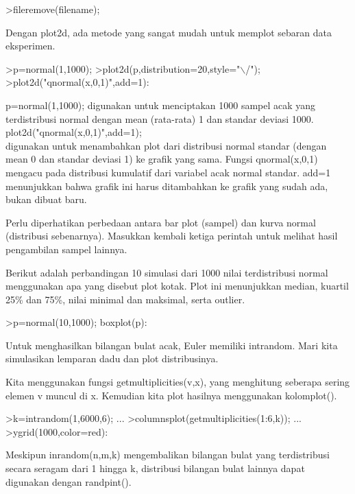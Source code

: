 \documentclass[a4paper,10pt]{article}
\begin{document}
\begin{eulernotebook}
\begin{eulercomment}
\begin{eulercomment}
\begin{eulerprompt}
>fileremove(filename);
\end{eulerprompt}
\begin{eulercomment}
Dengan plot2d, ada metode yang sangat mudah untuk memplot sebaran data
eksperimen.
\end{eulercomment}
\begin{eulerprompt}
>p=normal(1,1000); 
>plot2d(p,distribution=20,style="\(\backslash\)/");
>plot2d("qnormal(x,0,1)",add=1): 
\end{eulerprompt}
\begin{eulercomment}
p=normal(1,1000); digunakan untuk menciptakan 1000 sampel acak yang
terdistribusi normal dengan mean (rata-rata) 1 dan standar deviasi
1000.\\
plot2d("qnormal(x,0,1)",add=1);\\
digunakan untuk menambahkan plot dari distribusi normal standar
(dengan mean 0 dan standar deviasi 1) ke grafik yang sama. Fungsi
qnormal(x,0,1) mengacu pada distribusi kumulatif dari variabel acak
normal standar. add=1 menunjukkan bahwa grafik ini harus ditambahkan
ke grafik yang sudah ada, bukan dibuat baru.

Perlu diperhatikan perbedaan antara bar plot (sampel) dan kurva normal
(distribusi sebenarnya). Masukkan kembali ketiga perintah untuk
melihat hasil pengambilan sampel lainnya.

Berikut adalah perbandingan 10 simulasi dari 1000 nilai terdistribusi
normal menggunakan apa yang disebut plot kotak. Plot ini menunjukkan
median, kuartil 25\% dan 75\%, nilai minimal dan maksimal, serta
outlier.
\end{eulercomment}
\begin{eulerprompt}
>p=normal(10,1000); boxplot(p):
\end{eulerprompt}
\begin{eulercomment}
Untuk menghasilkan bilangan bulat acak, Euler memiliki intrandom. Mari
kita simulasikan lemparan dadu dan plot distribusinya.

Kita menggunakan fungsi getmultiplicities(v,x), yang menghitung
seberapa sering elemen v muncul di x. Kemudian kita plot hasilnya
menggunakan kolomplot().
\end{eulercomment}
\begin{eulerprompt}
>k=intrandom(1,6000,6);  ...
>columnsplot(getmultiplicities(1:6,k));  ...
>ygrid(1000,color=red):
\end{eulerprompt}
\begin{eulercomment}
Meskipun inrandom(n,m,k) mengembalikan bilangan bulat yang
terdistribusi secara seragam dari 1 hingga k, distribusi bilangan
bulat lainnya dapat digunakan dengan randpint().


\end{eulercomment}
\end{eulercomment}
\end{eulercomment}
\end{eulernotebook}
\end{document}
